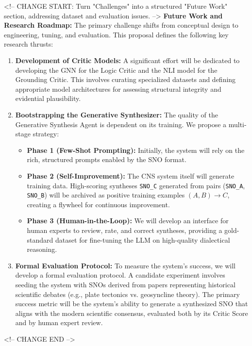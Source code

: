 \documentclass[12pt, a4paper]{article}
\begin{document}
<!-- CHANGE START: Turn "Challenges" into a structured "Future Work" section, addressing dataset and evaluation issues. -->
\textbf{Future Work and Research Roadmap:} The primary challenge shifts from conceptual design to engineering, tuning, and evaluation. This proposal defines the following key research thrusts:

\begin{enumerate}
    \item \textbf{Development of Critic Models:} A significant effort will be dedicated to developing the GNN for the Logic Critic and the NLI model for the Grounding Critic. This involves curating specialized datasets and defining appropriate model architectures for assessing structural integrity and evidential plausibility.
    
    \item \textbf{Bootstrapping the Generative Synthesizer:} The quality of the Generative Synthesis Agent is dependent on its training. We propose a multi-stage strategy:
        \begin{itemize}
            \item \textbf{Phase 1 (Few-Shot Prompting):} Initially, the system will rely on the rich, structured prompts enabled by the SNO format.
            \item \textbf{Phase 2 (Self-Improvement):} The CNS system itself will generate training data. High-scoring syntheses \texttt{SNO\_C} generated from pairs (\texttt{SNO\_A}, \texttt{SNO\_B}) will be archived as positive training examples $(A, B) \to C$, creating a flywheel for continuous improvement.
            \item \textbf{Phase 3 (Human-in-the-Loop):} We will develop an interface for human experts to review, rate, and correct syntheses, providing a gold-standard dataset for fine-tuning the LLM on high-quality dialectical reasoning.
        \end{itemize}

    \item \textbf{Formal Evaluation Protocol:} To measure the system's success, we will develop a formal evaluation protocol. A candidate experiment involves seeding the system with SNOs derived from papers representing historical scientific debates (e.g., plate tectonics vs. geosyncline theory). The primary success metric will be the system's ability to generate a synthesized SNO that aligns with the modern scientific consensus, evaluated both by its Critic Score and by human expert review.
\end{enumerate}
<!-- CHANGE END -->
\end{document}
